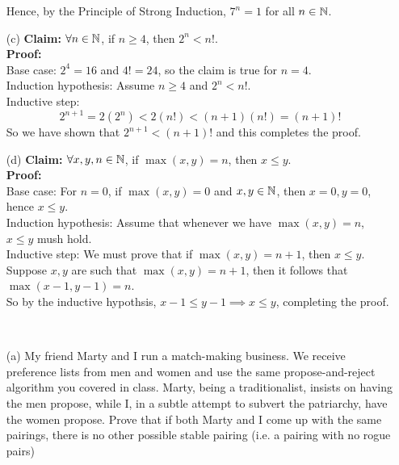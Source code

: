 \documentclass[11pt]{article}
\newif\ifsolutions
\begin{document}
\begin{qunlist}
\begin{itemize}
Hence, by the Principle of Strong Induction, $7^n = 1$ for all $n \in \mathbb{N}$.

\ifsolutions
\textbf{Solutions:}
\fi


\item[(c)]\textbf{Claim:} $\forall n \in \mathbb{N}$, if $n \geq 4$, then $2^n < n!$. \\
\textbf{Proof:} \\
Base case: $2^4 = 16$ and $4! = 24$, so the claim is true for $n=4$. \\
Induction hypothesis: Assume $n \geq 4$ and $2^n < n!$. \\
Inductive step: \[ 2^{n+1} = 2(2^n) < 2(n!) < (n+1)(n!) = (n+1)!\]
So we have shown that $2^{n+1} < (n+1)!$ and this completes the proof.

\ifsolutions
\textbf{Solutions:} This proof is correct.
\fi


\item[(d)]\textbf{Claim:} $\forall x,y,n \in \mathbb{N}$, if $\max(x,y) = n$, then $x \leq y$. \\
\textbf{Proof:} \\
Base case: For $n=0$, if $\max(x,y) = 0$ and $x,y \in \mathbb{N}$, then $x=0, y=0$, hence $x \leq y$. \\
Induction hypothesis: Assume that whenever we have $\max(x,y) = n$, $x \leq y$ mush hold. \\
Inductive step: We must prove that if $\max(x,y) = n+1$, then $x \leq y$. \\
Suppose $x,y$ are such that $\max(x,y) = n+1$, then it follows that $\max(x-1,y-1) = n$. \\
So by the inductive hypothsis, $x-1 \leq y-1  \implies x \leq y$, completing the proof.

\ifsolutions
\textbf{Solutions:}
\fi


\end{itemize}




 \\ 

\begin{itemize}
\item[(a)] My friend Marty and I run a match-making business. We receive preference lists from men and women and use the same propose-and-reject algorithm you covered in class. Marty, being a traditionalist, insists on having the men propose, while I, in a subtle attempt to subvert the patriarchy, have the women propose. Prove that if both Marty and I come up with the same pairings, there is no other possible stable pairing (i.e. a pairing with no rogue pairs)


\end{itemize}
\end{qunlist}
\end{document}
